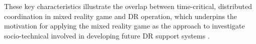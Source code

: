 These key characteristics illustrate the overlap between time-critical, distributed coordination in mixed reality game and \ac{DR} operation, which underpins the motivation for applying the mixed reality game as the approach to investigate socio-technical involved in developing future \ac{DR} support systems \cite{Fischer2012}.\\








